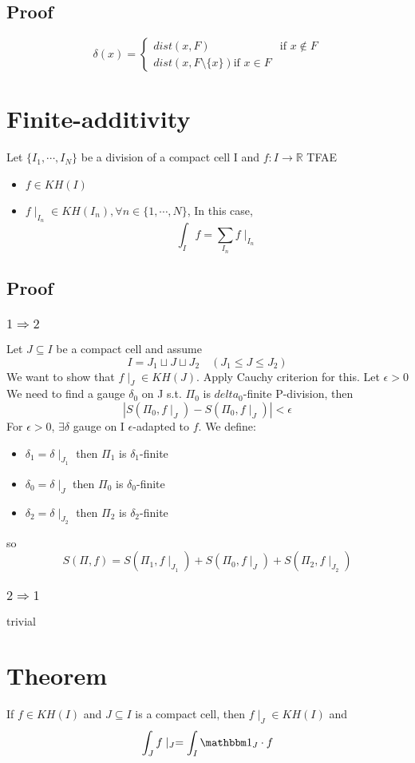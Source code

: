 \documentclass{book}
\newcommand{\abs}[1]{\left\lvert #1 \right\rvert}
\begin{document}
\subsection*{Proof}
$$\delta(x)=\begin{cases}
    dist(x,F)&\text{if }x\notin F\\
    dist(x,F\setminus\{x\})\text{if }x\in F
\end{cases}$$
\section{Finite-additivity}
Let $\{I_1,\cdots,I_N\}$ be a division of a compact cell I and $f:I\rightarrow \mathbb R$ TFAE
\begin{itemize}
    \item $f\in KH(I)$
    \item $f\mid_{I_n}\in KH(I_n),\forall n\in\{1,\cdots,N\}$, In this case, $$\int_If=\sum\limits_{I_n}f\mid_{I_n}$$
\end{itemize}
\subsection*{Proof}
\subsubsection{$1\Rightarrow 2$}
Let $J\subseteq I$ be a compact cell and assume $$I=J_1\sqcup J\sqcup J_2\quad(J_1\leq J\leq J_2)$$
We want to show that $f\mid_J\in KH(J)$. Apply Cauchy criterion for this. Let $\epsilon>0$ We need to find a gauge $\delta_0$ on J s.t. $\Pi_0$ is $delta_0$-finite P-division, then $$\abs{S(\Pi_0,f\mid_J)-S(\Pi_0,f\mid_J)}<\epsilon$$
For $\epsilon>0$, $\exists \delta$ gauge on I $\epsilon$-adapted to $f$. We define:
\begin{itemize}
    \item $\delta_1=\delta\mid_{J_1}$ then $\Pi_1$ is $\delta_1$-finite
    \item $\delta_0=\delta\mid_J$ then $\Pi_0$ is $\delta_0$-finite
    \item $\delta_2=\delta\mid_{J_2}$ then $\Pi_2$ is $\delta_2$-finite
\end{itemize}
so 
$$S(\Pi,f)=S(\Pi_1,f\mid_{J_1})+S(\Pi_0,f\mid_J)+S(\Pi_2,f\mid_{J_2})$$
\subsubsection{$2\Rightarrow 1$}trivial
\section{Theorem}
If $f\in KH(I)$ and $J\subseteq I$ is a compact cell, then $f\mid_J\in KH(I)$ and $$\int_Jf\mid_J=\int_I\mathbbm 1_J\cdot f$$
\end{document}
